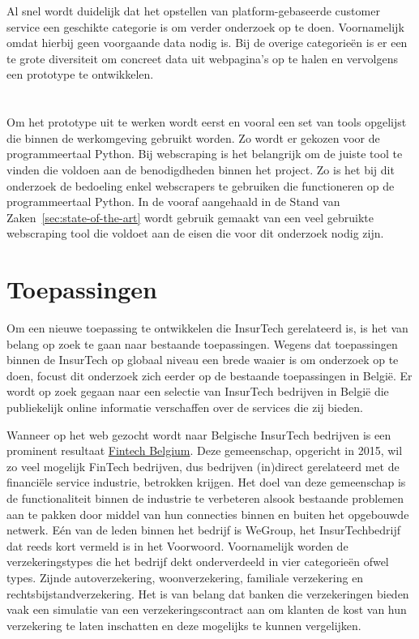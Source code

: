 Al snel wordt duidelijk dat het opstellen van platform-gebaseerde customer service een geschikte categorie is om verder onderzoek op te doen.
Voornamelijk omdat hierbij geen voorgaande data nodig is. Bij de overige categorieën is er een te grote diversiteit om concreet data uit webpagina's op te halen en vervolgens een prototype te ontwikkelen.

\section{}
\label{sec:Gebruikte tools}

Om het prototype uit te werken wordt eerst en vooral een set van tools opgelijst die binnen de werkomgeving gebruikt worden. Zo wordt er gekozen voor de programmeertaal Python.
Bij webscraping is het belangrijk om de juiste tool te vinden die voldoen aan de benodigdheden binnen het project. Zo is het bij dit onderzoek de bedoeling enkel webscrapers te gebruiken die functioneren op de programmeertaal Python. In de vooraf aangehaald in de Stand van Zaken~\ref{sec:state-of-the-art} wordt gebruik gemaakt van een veel gebruikte webscraping tool die voldoet aan de eisen die voor dit onderzoek nodig zijn.

\section{Toepassingen}

Om een nieuwe toepassing te ontwikkelen die InsurTech gerelateerd is, is het van belang op zoek te gaan naar bestaande toepassingen. Wegens dat toepassingen binnen de InsurTech op globaal niveau een brede waaier is om onderzoek op te doen, focust dit onderzoek zich eerder op de bestaande toepassingen in België. Er wordt op zoek gegaan naar een selectie van InsurTech bedrijven in België die publiekelijk online informatie verschaffen over de services die zij bieden. 

Wanneer op het web gezocht wordt naar Belgische InsurTech bedrijven is een prominent resultaat \href{https://www.fintechbelgium.be/}{Fintech Belgium}. Deze gemeenschap, opgericht in 2015, wil zo veel mogelijk FinTech bedrijven, dus bedrijven (in)direct gerelateerd met de financiële service industrie, betrokken krijgen. Het doel van deze gemeenschap is de functionaliteit binnen de industrie te verbeteren alsook bestaande problemen aan te pakken door middel van hun connecties binnen en buiten het opgebouwde netwerk. Eén van de leden binnen het bedrijf is WeGroup, het InsurTechbedrijf dat reeds kort vermeld is in het Voorwoord. Voornamelijk worden de verzekeringstypes die het bedrijf dekt onderverdeeld in vier categorieën ofwel types. Zijnde autoverzekering, woonverzekering, familiale verzekering en rechtsbijstandverzekering.
Het is van belang dat banken die verzekeringen bieden vaak een simulatie van een verzekeringscontract aan om klanten de kost van hun verzekering te laten inschatten en deze mogelijks te kunnen vergelijken.

